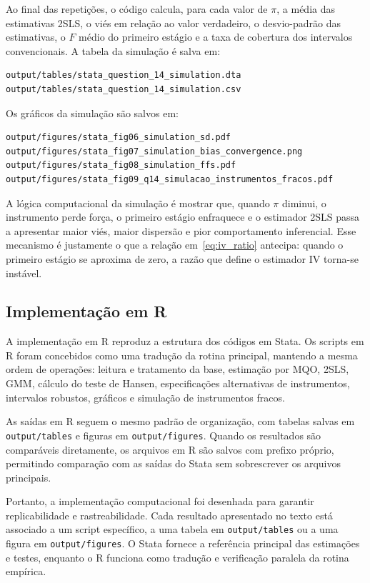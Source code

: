\documentclass[12pt,a4paper]{article}
\begin{document}
Ao final das repetições, o código calcula, para cada valor de \(\pi\), a média das estimativas 2SLS, o viés em relação ao valor verdadeiro, o desvio-padrão das estimativas, o \(F\) médio do primeiro estágio e a taxa de cobertura dos intervalos convencionais. A tabela da simulação é salva em:

\begin{verbatim}
output/tables/stata_question_14_simulation.dta
output/tables/stata_question_14_simulation.csv
\end{verbatim}

Os gráficos da simulação são salvos em:

\begin{verbatim}
output/figures/stata_fig06_simulation_sd.pdf
output/figures/stata_fig07_simulation_bias_convergence.png
output/figures/stata_fig08_simulation_ffs.pdf
output/figures/stata_fig09_q14_simulacao_instrumentos_fracos.pdf
\end{verbatim}

A lógica computacional da simulação é mostrar que, quando \(\pi\) diminui, o instrumento perde força, o primeiro estágio enfraquece e o estimador 2SLS passa a apresentar maior viés, maior dispersão e pior comportamento inferencial. Esse mecanismo é justamente o que a relação em~\eqref{eq:iv_ratio} antecipa: quando o primeiro estágio se aproxima de zero, a razão que define o estimador IV torna-se instável.

\subsection*{Implementação em R}

A implementação em R reproduz a estrutura dos códigos em Stata. Os scripts em R foram concebidos como uma tradução da rotina principal, mantendo a mesma ordem de operações: leitura e tratamento da base, estimação por MQO, 2SLS, GMM, cálculo do teste de Hansen, especificações alternativas de instrumentos, intervalos robustos, gráficos e simulação de instrumentos fracos.

As saídas em R seguem o mesmo padrão de organização, com tabelas salvas em \texttt{output/tables} e figuras em \texttt{output/figures}. Quando os resultados são comparáveis diretamente, os arquivos em R são salvos com prefixo próprio, permitindo comparação com as saídas do Stata sem sobrescrever os arquivos principais.

Portanto, a implementação computacional foi desenhada para garantir replicabilidade e rastreabilidade. Cada resultado apresentado no texto está associado a um script específico, a uma tabela em \texttt{output/tables} ou a uma figura em \texttt{output/figures}. O Stata fornece a referência principal das estimações e testes, enquanto o R funciona como tradução e verificação paralela da rotina empírica.
\end{document}
